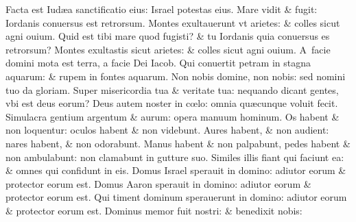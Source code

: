 \documentclass[a5paper,10pt]{book}
\def\ae{æ}
\def\oe{œ}
\begin{document}
\begin{multicols*}{2}
\newline \color{red} F\color{black}acta est Iud\ae a sanctificatio eius: Israel potestas eius.
\newline \color{red} M\color{black}are vidit \& fugit: Iordanis conuersus est retrorsum.
\newline \color{red} M\color{black}ontes exultauerunt vt arietes: \& colles sicut agni ouium.
\newline \color{red} Q\color{black}uid est tibi mare quod fugisti? \& tu Iordanis quia conuersus es retrorsum?%
\newline \color{red} M\color{black}ontes exultastis sicut arietes: \& colles sicut agni ouium.
\newline \color{red} A\color{black}\ facie domini mota est terra, a facie Dei Iacob.
\newline \color{red} Q\color{black}ui conuertit petram in stagna aquarum: \& rupem in fontes aquarum.
\newline \color{red} N\color{black}on nobis domine, non nobis: sed nomini tuo da gloriam.
\newline \color{red} S\color{black}uper misericordia tua \& veritate tua: nequando dicant gentes, vbi est deus eorum?
\newline \color{red} D\color{black}eus autem noster in c\oe lo: omnia qu\ae cunque voluit fecit.
\newline \color{red} S\color{black}imulacra gentium argentum \& aurum: opera manuum hominum.
\newline \color{red} O\color{black}s habent \& non loquentur: oculos habent \& non videbunt.
\newline \color{red} A\color{black}ures habent, \& non audient: nares habent, \& non odorabunt.
\newline \color{red} M\color{black}anus habent \& non palpabunt, pedes habent \& non ambulabunt: non clamabunt in gutture suo.
\newline \color{red} S\color{black}imiles illis fiant qui faciunt ea: \& omnes qui confidunt in eis.
\newline \color{red} D\color{black}omus Israel sperauit in domino: adiutor eorum \& protector eorum est.
\newline \color{red} D\color{black}omus Aaron sperauit in domino: adiutor eorum \& protector eorum est.
\newline \color{red} Q\color{black}ui timent dominum sperauerunt in domino: adiutor eorum \& protector eorum est.
\newline \color{red} D\color{black}ominus memor fuit nostri: \& benedixit nobis:

\end{multicols*}
\end{document}
